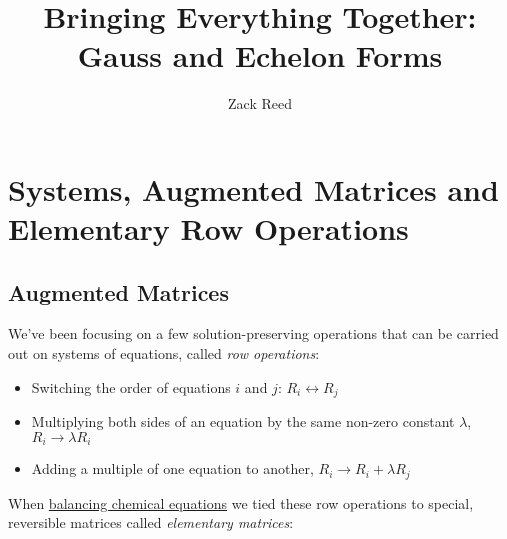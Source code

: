 \documentclass{ximera}
\author{Zack Reed} %
\title{Bringing Everything Together: Gauss and Echelon Forms}
\begin{document}
\begin{abstract}

\end{abstract}
\maketitle
    
\section*{Systems, Augmented Matrices and Elementary Row Operations}
 
\subsection*{Augmented Matrices}
 
We've been focusing on a few solution-preserving operations that can be carried out on systems of equations, called \emph{row operations}:
\begin{itemize}
\item Switching the order of equations $i$ and $j$: $R_i\leftrightarrow R_j$
\item Multiplying both sides of an equation by the same non-zero constant $\lambda$, $R_i\rightarrow\lambda R_i$
\item Adding a multiple of one equation to another, $R_i\rightarrow R_i+\lambda R_j$
\end{itemize}
 
 
When \href{https://ximera.osu.edu/appliedlinearalgebra/c3ChapterThree/learningActivities/m3LearningActivities/modThreeSystems/matricesAreSystemsOfEquations2}{balancing chemical equations} we tied these row operations to special, reversible matrices called \emph{elementary matrices}:
\end{document}
